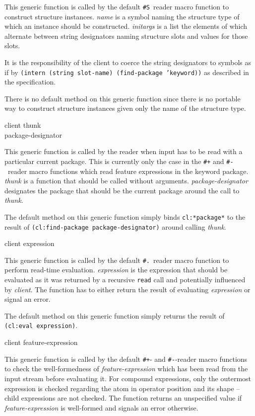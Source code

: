 This generic function is called by the default \texttt{\#S}~reader
macro function to construct structure instances.  \textit{name} is a
symbol naming the structure type of which an instance should be
constructed.  \textit{initargs} is a list the elements of which
alternate between string designators naming structure slots and values
for those slots.

It is the responsibility of the client to coerce the string
designators to symbols as if by \texttt{(intern (string slot-name)
  (find-package 'keyword))} as described in the \commonlisp{}
specification.

There is no default method on this generic function since there is no
portable way to construct structure instances given only the name of
the structure type.

 {client thunk \\
  package-designator}

This generic function is called by the reader when input has to be
read with a particular current package.  This is currently only the
case in the \texttt{\#+} and \texttt{\#-}~reader macro functions which
read feature expressions in the keyword package.  \textit{thunk} is a
function that should be called without arguments.
\textit{package-designator} designates the package that should be the
current package around the call to \textit{thunk}.

The default method on this generic function simply binds
\texttt{cl:*package*} to the result of \texttt{(cl:find-package
  package-designator)} around calling \textit{thunk}.

 {client expression}

This generic function is called by the default \texttt{\#.}~reader
macro function to perform read-time evaluation.  \textit{expression}
is the expression that should be evaluated as it was returned by a
recursive \texttt{read} call and potentially influenced by
\textit{client}.  The function has to either return the result of
evaluating \textit{expression} or signal an error.

The default method on this generic function simply returns the result
of \texttt{(cl:eval expression)}.

 {client feature-expression}

This generic function is called by the default \texttt{\#+}- and
\texttt{\#-}-reader macro functions to check the well-formedness of
\textit{feature-expression} which has been read from the input stream
before evaluating it.  For compound expressions, only the outermost
expression is checked regarding the atom in operator position and its
shape -- child expressions are not checked.  The function returns an
unspecified value if \textit{feature-expression} is well-formed and
signals an error otherwise.


